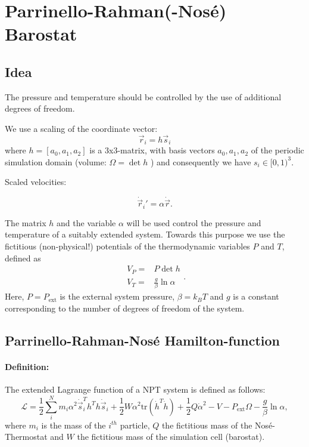 \section{Parrinello-Rahman(-Nos\'e) Barostat}
\label{section:ensembles:barostat}
\subsection{Idea}
The pressure and temperature should be controlled by the use of additional degrees of freedom.

We use a scaling of the coordinate vector:
\begin{equation}
  \vec{r}_i = h \vec{s}_i
\end{equation}
where \( h = [ a_0, a_1, a_2 ] \) is a 3x3-matrix, with basis vectors \( a_0, a_1, a_2 \) of the periodic simulation domain (volume: \( \Omega = \det{h} \) ) and consequently we have \( s_i \in [0,1)^3 \).

Scaled velocities:

\begin{equation}
  \dot{\vec{r}}_i' = \alpha \dot{\vec{r}}
  .
\end{equation}

The matrix \( h \) and the variable \( \alpha \) will be used control the pressure and temperature of a suitably extended system.
Towards this purpose we use the fictitious (non-physical!) potentials of the thermodynamic variables \( P \) and \( T \), defined as
\begin{equation}
  \begin{split}
    V_P = 
    & P \det{h} \\
    V_T = 
    & \frac{g}{\beta}\ln{\alpha}
  \end{split}.
\end{equation}
Here, \( P = P_\mathrm{ext} \) is the external system pressure, \( \beta = k_BT \) and \( g \) is a constant corresponding to the number of degrees of freedom of the system.

\subsection{Parrinello-Rahman-Nos\'e Hamilton-function}

\paragraph{Definition:}
  The extended Lagrange function of a NPT system is defined as follows:
  \begin{equation}
    \label{for:LagrangeFunktion}
    \mathcal{L} = \frac{1}{2} \sum_i^N m_i \alpha^2 \dot{\vec{s}}_i^T h^T h \dot{\vec{s}}_i + \frac{1}{2} W \alpha^2 \mathrm{tr}(\dot{h}^T\dot{h}) + \frac{1}{2} Q \dot{\alpha}^2 - V - P_\mathrm{ext} \Omega - \frac{g}{\beta}\ln{\alpha}
    ,
  \end{equation}
  where \( m_i \) is the mass of the \(i^{th}\) particle, \( Q \) the fictitious mass of the Nos\'e-Thermostat and \( W \) the fictitious mass of the simulation cell (barostat). 

